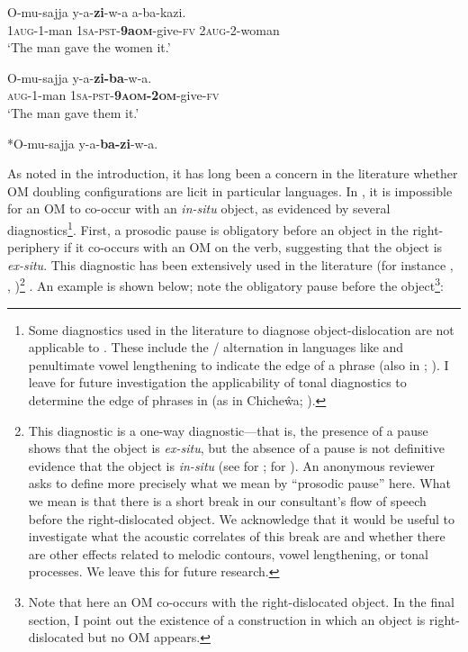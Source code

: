 \documentclass[output=paper
,newtxmath
,modfonts
,nonflat]{langsci/langscibook}
\begin{document}
\ex\label{ex:ranero:9b}
\gll O-mu-sajja    y-a-\textbf{zi}{}-w-a            a-ba-kazi.\\
1\textsc{aug}{}-1-man 1\textsc{sa}{}-\textsc{pst}{}-\textbf{9a\textsc{om}}{}-give-\textsc{fv} 2\textsc{aug}{}-2-woman\\
\glt ‘The man gave the women it.’

\ex\label{ex:ranero:9c}
\gll O-mu-sajja  y-a-\textbf{zi-ba}{}-w-a. \\       
\textsc{aug-}1-man \textsc{1sa-pst}{}-\textbf{\textsc{9aom-2om}}{}-give-\textsc{fv}\\
\glt ‘The man gave them it.’

\ex\label{ex:ranero:9d}*O-mu-sajja y-a-\textbf{ba-zi}{}-w-a.
\z
\z

As noted in the introduction, it has long been a concern in the  literature whether OM doubling configurations are licit in particular languages. In , it is impossible for an OM to co-occur with an \textit{in-situ} object, as evidenced by several diagnostics\footnote{Some diagnostics used in the  literature to diagnose object-dislocation are not applicable to . These include the / alternation in languages like  \citep{Zeller2015} and penultimate vowel lengthening to indicate the edge of a phrase (also in ; \citealt{ChengDowning2009}). I leave for future investigation the applicability of tonal diagnostics to determine the edge of phrases in  (as in Chiche\^wa; \citealt{Bresnan1987}).}. First, a prosodic pause is obligatory before an object in the right-periphery if it co-occurs with an OM on the verb, suggesting that the object is \textit{ex-situ}. This diagnostic has been extensively used in the  literature (for instance \citealt{Cecchetto1999}, \citealt{Cruschina2011}, \citealt{anagnostopouloutoappear})\footnote{This diagnostic is a one-way diagnostic—that is, the presence of a pause shows that the object is \textit{ex-situ}, but the absence of a pause is not definitive evidence that the object is \textit{in-situ} (see \citealt{dierckstoappear} for ; \citealt{diercks2015} for ). An anonymous reviewer asks to define more precisely what we mean by “prosodic pause” here. What we mean is that there is a short break in our consultant’s flow of speech before the right-dislocated object. We acknowledge that it would be useful to investigate what the acoustic correlates of this break are and whether there are other effects related to melodic contours, vowel lengthening, or tonal processes. We leave this for future research.} . An example is shown below; note the obligatory pause before the object\footnote{Note that here an OM co-occurs with the right-dislocated object. In the final section, I point out the existence of a construction in which an object is right-dislocated but no OM appears.}:
\end{document}
